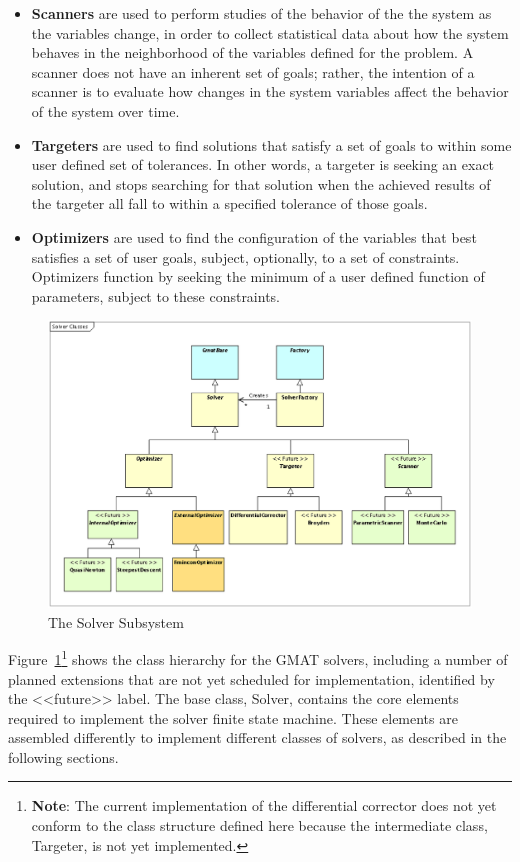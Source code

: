 \begin{itemize}
\item \textbf{Scanners} are used to perform studies of the behavior of the the system as the
variables change, in order to collect statistical data about how the system behaves in the
neighborhood of the variables defined for the problem.  A scanner does not have an inherent set of
goals; rather, the intention of a scanner is to evaluate how changes in the system variables affect
the behavior of the system over time.
\item \textbf{Targeters} are used to find solutions that satisfy a set of goals to within some user
defined set of tolerances.  In other words, a targeter is seeking an exact solution, and stops
searching for that solution when the achieved results of the targeter all fall to within a specified
tolerance of those goals.
\item \textbf{Optimizers} are used to find the configuration of the variables that best satisfies a
set of user goals, subject, optionally, to a set of constraints.  Optimizers function by seeking the
minimum of a user defined function of parameters, subject to these constraints.
\end{itemize}

\begin{figure}[tb]
\begin{center}
\includegraphics[scale=0.5]{Images/SolverClasses.eps}
\caption{\label{figure:SolverClasses}The Solver Subsystem}
\end{center}
\end{figure}

Figure~\ref{figure:SolverClasses}\footnote{\textbf{Note}: The current implementation of the
differential corrector does not yet conform to the class structure defined here because the
intermediate class, Targeter, is not yet implemented.} shows the class hierarchy for the GMAT
solvers, including a number of planned extensions that are not yet scheduled for implementation,
identified by the <<future>> label. The base class, Solver, contains the core elements required to
implement the solver finite state machine.  These elements are assembled differently to implement
different classes of solvers, as described in the following sections.

